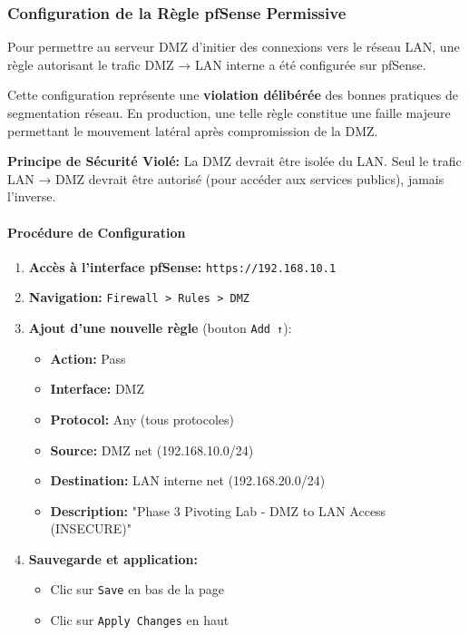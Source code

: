 \documentclass[12pt,a4paper,openany]{report}
\begin{document}
	\subsubsection{Configuration de la Règle pfSense Permissive}
	
	Pour permettre au serveur DMZ d'initier des connexions vers le réseau LAN,
	une règle autorisant le trafic DMZ → LAN interne a été configurée sur pfSense.
	
	\begin{tcolorbox}[colback=accent!5!white, colframe=accent,
		title=\textbf{⚠️ ERREUR DE CONFIGURATION SIMULÉE}]
		
		Cette configuration représente une \textbf{violation délibérée} des bonnes
		pratiques de segmentation réseau. En production, une telle règle constitue
		une faille majeure permettant le mouvement latéral après compromission de la DMZ.
		
		\textbf{Principe de Sécurité Violé:} La DMZ devrait être isolée du LAN.
		Seul le trafic LAN → DMZ devrait être autorisé (pour accéder aux services
		publics), jamais l'inverse.
		
	\end{tcolorbox}
	
	\paragraph{Procédure de Configuration}
	
	\begin{enumerate}
		\item \textbf{Accès à l'interface pfSense:} \texttt{https://192.168.10.1}
		
		\item \textbf{Navigation:} \texttt{Firewall > Rules > DMZ}
		
		\item \textbf{Ajout d'une nouvelle règle} (bouton \texttt{Add ↑}):
		\begin{itemize}
			\item \textbf{Action:} Pass
			\item \textbf{Interface:} DMZ
			\item \textbf{Protocol:} Any (tous protocoles)
			\item \textbf{Source:} DMZ net (192.168.10.0/24)
			\item \textbf{Destination:} LAN interne net (192.168.20.0/24)
			\item \textbf{Description:} "Phase 3 Pivoting Lab - DMZ to LAN Access (INSECURE)"
		\end{itemize}
		
		\item \textbf{Sauvegarde et application:}
		\begin{itemize}
			\item Clic sur \texttt{Save} en bas de la page
			\item Clic sur \texttt{Apply Changes} en haut
		\end{itemize}
	\end{enumerate}
	
\end{document}
